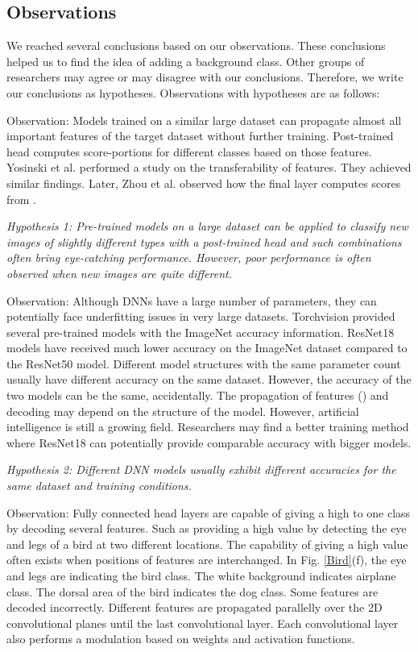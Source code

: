 \documentclass{article}
\begin{document}
\subsection{Observations}
We reached several conclusions based on our observations. These conclusions helped us to find the idea of adding a background class. Other groups of researchers may agree or may disagree with our conclusions. Therefore, we write our conclusions as hypotheses. Observations with hypotheses are as follows:  

Observation: Models trained on a similar large dataset can propagate almost all important features of the target dataset without further training. Post-trained head computes score-portions  for different classes  based on those features. Yosinski et al. \cite{yosinski2014transferable} performed a study on the transferability of features. They achieved similar findings. Later, Zhou et al. \cite{zhou2016learning} observed how the final layer computes scores from .

\emph{Hypothesis 1: Pre-trained models on a large dataset can be applied to classify new images of slightly different types with a post-trained head and such combinations often bring eye-catching performance. However, poor performance is often observed when new images are quite different.} 


Observation: Although DNNs have a large number of parameters, they can potentially face underfitting issues in very large datasets. Torchvision \cite{marcel2010torchvision} provided several pre-trained models with the ImageNet accuracy information. ResNet18 models have received much lower accuracy on the ImageNet dataset compared to the ResNet50 model. Different model structures with the same parameter count usually have different accuracy on the same dataset. However, the accuracy of the two models can be the same, accidentally. The propagation of features () and decoding may depend on the structure of the model. However, artificial intelligence is still a growing field. Researchers may find a better training method where ResNet18 can potentially provide comparable accuracy with bigger models. 

\emph{Hypothesis 2: Different DNN models usually exhibit different accuracies for the same dataset and training conditions. }



Observation: Fully connected head layers are capable of giving a high  to one class by decoding several features. Such as providing a high  value by detecting the eye and legs of a bird at two different  locations. The capability of giving a high value often exists when positions  of features are interchanged. In Fig. \ref{Bird}(f), the eye and legs are indicating the bird class. The white background indicates airplane class. The dorsal area of the bird indicates the dog class. Some features are decoded incorrectly. Different features are propagated parallelly over the 2D convolutional planes until the last convolutional layer. Each convolutional layer also performs a modulation based on weights and activation functions. 
\end{document}
